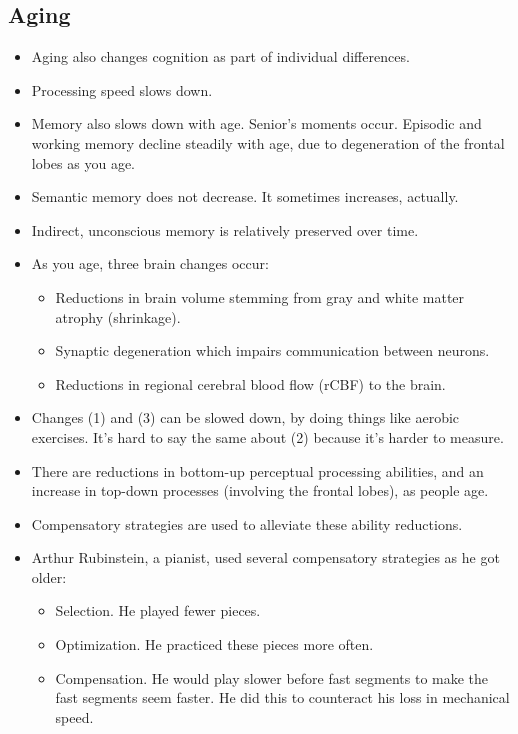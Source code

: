 \documentclass[]{article}
\newcommand{\lecture}[1]{\marginpar{{\footnotesize $\leftarrow$ \underline{#1}}}}
\begin{document}
		\subsection{Aging}
			\begin{itemize}
				\item Aging also changes cognition as part of individual differences.
				\item Processing speed slows down.
				\item Memory also slows down with age. Senior's moments occur. Episodic and working memory decline steadily with age, due to degeneration of the frontal lobes as you age.
				\item Semantic memory does not decrease. It sometimes increases, actually.
				\item Indirect, unconscious memory is relatively preserved over time.
				\item As you age, three brain changes occur:
					\begin{itemize}
						\item Reductions in brain volume stemming from gray and white matter atrophy (shrinkage).
						\item Synaptic degeneration which impairs communication between neurons.
						\item Reductions in regional cerebral blood flow (rCBF) to the brain.
					\end{itemize}

				\item Changes (1) and (3) can be slowed down, by doing things like aerobic exercises. It's hard to say the same about (2) because it's harder to measure.

				\item There are reductions in bottom-up perceptual processing abilities, and an increase in top-down processes (involving the frontal lobes), as people age. \lecture{April 2, 2013}
				\item Compensatory strategies are used to alleviate these ability reductions.
				\item Arthur Rubinstein, a pianist, used several compensatory strategies as he got older:
					\begin{itemize}
						\item Selection. He played fewer pieces.
						\item Optimization. He practiced these pieces more often.
						\item Compensation. He would play slower before fast segments to make the fast segments seem faster. He did this to counteract his loss in mechanical speed.
					\end{itemize}


\end{itemize}
\end{document}
